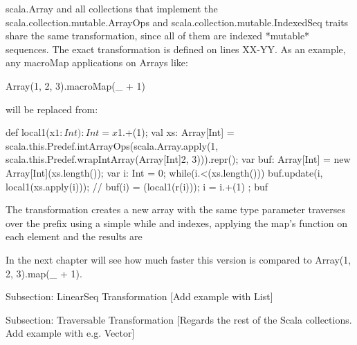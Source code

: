 scala.Array and all collections that implement the 
scala.collection.mutable.ArrayOps and scala.collection.mutable.IndexedSeq traits
share the same transformation, since all of them are indexed *mutable*
sequences. The exact transformation is defined on lines XX-YY. As an example,
any macroMap applications on Arrays like:

Array(1, 2, 3).macroMap(_ + 1)

will be replaced from:

{
  def local1(x$1: Int): Int = x$1.+(1);
  val xs: Array[Int] = scala.this.Predef.intArrayOps(scala.Array.apply(1,
scala.this.Predef.wrapIntArray(Array[Int]{2, 3}))).repr();
  var buf: Array[Int] = new Array[Int](xs.length());
  var i: Int = 0;
  while(i.<(xs.length())){
    buf.update(i, local1(xs.apply(i))); // buf(i) = (local1(r(i)));
    i = i.+(1)
  };
  buf
}

The transformation creates a new array with the same type parameter traverses
over the prefix using a simple while and indexes, applying the map's function on
each element and the results are 

In the next chapter will see how much faster this version is compared to
Array(1, 2, 3).map(_ + 1).


Subsection: LinearSeq Transformation
[Add example with List]


Subsection: Traversable Transformation
[Regards the rest of the Scala collections. Add example with e.g. Vector]
